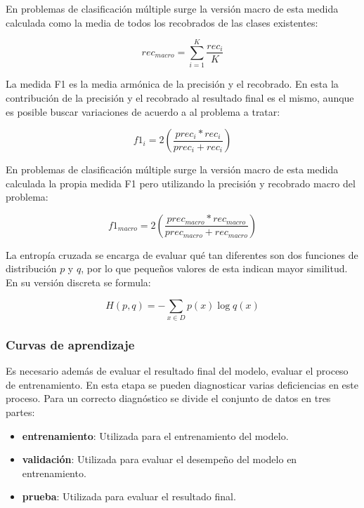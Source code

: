En problemas de clasificación múltiple surge la versión macro de esta medida calculada como la media de todos
los recobrados de las clases existentes:

\begin{equation}
	rec_{macro} = \sum^K_{i=1} \frac{rec_i}{K}
\end{equation}

La medida F1 es la media armónica de la precisión y el recobrado. En esta la contribución de la precisión y el
recobrado al resultado final es el mismo, aunque es posible buscar variaciones de acuerdo a al problema a tratar:

\begin{equation}
	f1_i = 2 (\frac{prec_i * rec_i}{prec_i + rec_i})
\end{equation}

En problemas de clasificación múltiple surge la versión macro de esta medida calculada la propia medida F1 pero
utilizando la precisión y recobrado macro del problema:

\begin{equation}
	f1_{macro} = 2 (\frac{prec_{macro} * rec_{macro}}{prec_{macro} + rec_{macro}})
\end{equation}

La entropía cruzada se encarga de evaluar qué tan diferentes son dos funciones de distribución $p$ y $q$, por lo que
pequeños valores de esta indican mayor similitud. En su versión discreta se formula:

\begin{equation}
	H(p, q) = - \sum_{x \in D} p(x) \log q(x)
\end{equation}

\subsubsection{Curvas de aprendizaje}

Es necesario además de evaluar el resultado final del modelo, evaluar el proceso de entrenamiento. En esta etapa 
se pueden diagnosticar varias deficiencias en este proceso. Para un correcto diagnóstico se divide el conjunto de 
datos en tres partes:

\begin{itemize}
	\item \textbf{entrenamiento}: Utilizada para el entrenamiento del modelo.
	\item \textbf{validación}: Utilizada para evaluar el desempeño del modelo en entrenamiento.
	\item \textbf{prueba}: Utilizada para evaluar el resultado final.
\end{itemize}

